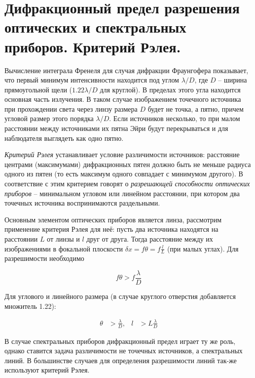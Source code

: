 \section{Дифракционный предел разрешения оптических и спектральных приборов. Критерий Рэлея.}

Вычисление интеграла Френеля для случая дифракции Фраунгофера показывает, что первый минимум интенсивности находится под углом $\lambda / D$, где $D$ -- ширина прямоугольной щели ($1.22 \lambda / D$ для круглой). В пределах этого угла находится основная часть излучения. В таком случае изображением точечного источника при прохождении света через линзу размера $D$ будет не точка, а пятно, причем угловой размер этого порядка $\lambda / D$. Если источников несколько, то при малом расстоянии между источниками их пятна Эйри будут перекрываться и для наблюдателя выглядеть как одно пятно.

\textit{Критерий Рэлея} устанавливает условие различимости источников: расстояние центрами (максимумами) дифракционных пятен должно быть не меньше радиуса одного из пятен (то есть максимум одного совпадает с минимумом другого). В соответствие с этим критерием говорят о \textit{разрешающей способности оптических приборов} -- минимальном угловом или линейном расстоянии, при котором два точечных источника воспринимаются раздельными.

Основным элементом оптических приборов является линза, рассмотрим применение критерия Рэлея для неё: пусть два источника находятся на расстоянии $L$ от линзы и $l$ друг от друга. Тогда расстояние между их изображениями в фокальной плоскости $\delta x = f \theta = f \frac{l}{L}$ (при малых углах). Для разрешимости необходимо

\begin{equation}
    f \theta > f \frac{\lambda}{D}
\end{equation}

\noindent
Для углового и линейного размера (в случае круглого отверстия добавляется множитель 1.22):

\begin{align}
    \theta &> \frac{\lambda}{D}, & l &> L \frac{\lambda}{D}
\end{align}

В случае спектральных приборов дифракционный предел играет ту же роль, однако ставится задача различимости не точечных источников, а спектральных линий. В большинстве случаев для определения разрешимости линий так-же используют критерий Рэлея.